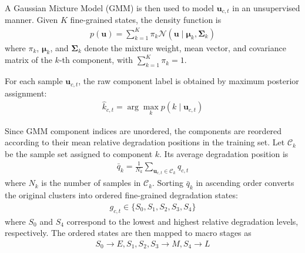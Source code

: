 \documentclass[a4paper,fleqn]{cas-sc}
\begin{document}
  A Gaussian Mixture Model (GMM) is then used to model $\mathbf{u}_{c,t}$ in an unsupervised manner. Given $K$ fine-grained states, the density function is
  \begin{equation}
    \begin{aligned}
      p(\mathbf{u}) =
      \sum_{k=1}^{K}\pi_k
      \mathcal{N}(\mathbf{u}\mid \boldsymbol{\mu}_k,\boldsymbol{\Sigma}_k)
    \end{aligned}
  \label{eq:gmm}
\end{equation}
  where $\pi_k$, $\boldsymbol{\mu}_k$, and $\boldsymbol{\Sigma}_k$ denote the mixture weight, mean vector, and covariance matrix of the $k$-th component, with $\sum_{k=1}^{K} \pi_k=1$.

  For each sample $\mathbf{u}_{c,t}$, the raw component label is obtained by maximum posterior assignment:
  \begin{equation}
    \begin{aligned}
      \hat{k}_{c,t}=\arg\max_{k}p(k\mid \mathbf{u}_{c,t})
    \end{aligned}
  \end{equation}
  
  Since GMM component indices are unordered, the components are reordered according to their mean relative degradation positions in the training set. Let $\mathcal{C}_{k}$ be the sample set assigned to component $k$. Its average degradation position is
  \begin{equation}
    \begin{aligned}
      \bar{q}_k =
      \frac{1}{N_k}\sum_{\mathbf{u}_{c,t}\in \mathcal{C}_k} q_{c,t}
    \end{aligned}
  \end{equation}
  where $N_k$ is the number of samples in $\mathcal{C}_k$. Sorting $\bar{q}_k$ in ascending order converts the original clusters into ordered fine-grained degradation states:
  \begin{equation}
    \begin{aligned}
      g_{c,t}\in \{S_0,S_1,S_2,S_3,S_4\}
    \end{aligned}
  \end{equation}
  where $S_{0}$ and $S_{4}$ correspond to the lowest and highest relative degradation levels, respectively. The ordered states are then mapped to macro stages as
  \begin{equation}
    \begin{aligned}
      S_{0}\to E,S_{1},S_{2},S_{3}\to M,S_{4}\to L
    \end{aligned}
  \end{equation}
  
\end{document}

